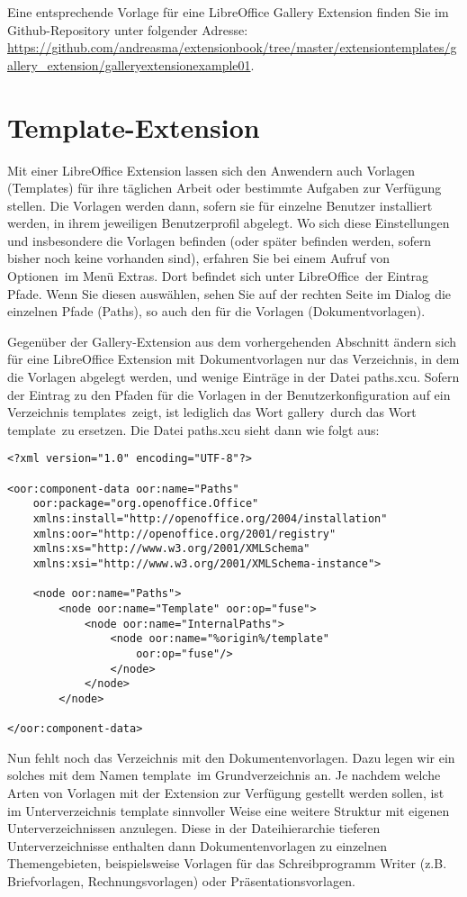 \documentclass[a4paper,10pt,pagesize,titlepage]{scrbook}
\begin{document}
Eine entsprechende Vorlage für eine LibreOffice Gallery Extension finden Sie im Github-Repository unter folgender Adresse:
\url{https://github.com/andreasma/extensionbook/tree/master/extensiontemplates/gallery_extension/galleryextensionexample01}.

\section{Template-Extension}

Mit einer LibreOffice Extension lassen sich den Anwendern auch Vorlagen (Templates) für ihre täglichen Arbeit oder bestimmte Aufgaben zur Verfügung stellen. Die Vorlagen werden dann, sofern sie für einzelne Benutzer installiert werden, in ihrem jeweiligen Benutzerprofil abgelegt. Wo sich diese Einstellungen und insbesondere die Vorlagen befinden (oder später befinden werden, sofern bisher noch keine vorhanden sind), erfahren Sie bei einem Aufruf von \glqq Optionen\grqq~im Menü \glqq Extras\grqq. Dort befindet sich unter \glqq LibreOffice\grqq~der Eintrag \glqq Pfade\grqq. Wenn Sie diesen auswählen, sehen Sie auf der rechten Seite im Dialog die einzelnen Pfade (Paths), so auch den für die Vorlagen (\glqq Dokumentvorlagen\grqq).

Gegenüber der Gallery-Extension aus dem vorhergehenden Abschnitt ändern sich für  eine LibreOffice Extension mit Dokumentvorlagen nur das Verzeichnis, in dem die Vorlagen abgelegt werden, und wenige Einträge in der Datei \glqq paths.xcu\grqq. Sofern der Eintrag zu den Pfaden für die Vorlagen in der Benutzerkonfiguration auf ein Verzeichnis \glqq templates\grqq~zeigt, ist lediglich das Wort \glqq gallery\grqq~durch das Wort \glqq template\grqq~zu ersetzen. Die Datei paths.xcu sieht dann wie folgt aus:

\begin{lstlisting}
<?xml version="1.0" encoding="UTF-8"?>

<oor:component-data oor:name="Paths" 
    oor:package="org.openoffice.Office" 
    xmlns:install="http://openoffice.org/2004/installation" 
    xmlns:oor="http://openoffice.org/2001/registry"
    xmlns:xs="http://www.w3.org/2001/XMLSchema" 
    xmlns:xsi="http://www.w3.org/2001/XMLSchema-instance">

    <node oor:name="Paths">
        <node oor:name="Template" oor:op="fuse">
            <node oor:name="InternalPaths">
                <node oor:name="%origin%/template" 
                    oor:op="fuse"/>
                </node>
            </node>
        </node>

</oor:component-data>
\end{lstlisting}
Nun fehlt noch das Verzeichnis mit den Dokumentenvorlagen. Dazu legen wir ein solches mit dem Namen \glqq template\grqq~im Grundverzeichnis an. Je nachdem welche Arten von Vorlagen mit der Extension zur Verfügung gestellt werden sollen, ist im Unterverzeichnis template sinnvoller Weise eine weitere Struktur mit eigenen Unterverzeichnissen anzulegen. Diese in der Dateihierarchie tieferen Unterverzeichnisse enthalten dann Dokumentenvorlagen zu einzelnen Themengebieten, beispielsweise Vorlagen für das Schreibprogramm Writer (z.B. Briefvorlagen, Rechnungsvorlagen) oder Präsentationsvorlagen.
\end{document}
